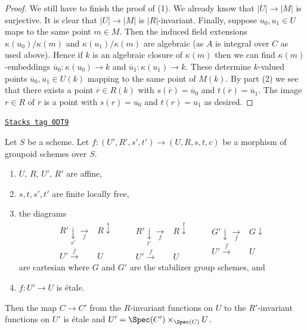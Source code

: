 \begin{proof}
\medskip\noindent
We still have to finish the proof of (1). We already know that
$|U| \to |M|$ is surjective. It is clear that $|U| \to |M|$ is
$|R|$-invariant. Finally, suppose $u_0, u_1 \in U$ maps to the same
point $m \in M$. Then the induced field extensions $\kappa(u_0)/\kappa(m)$
and $\kappa(u_1)/\kappa(m)$ are algebraic (as $A$ is integral over $C$
as used above). Hence if $k$ is an algebraic closure of $\kappa(m)$
then we can find $\kappa(m)$-embeddings $\overline{u}_0 : \kappa(u_0) \to k$
and $\overline{u}_1 : \kappa(u_1) \to k$. These determine $k$-valued
points $\overline{u}_0, \overline{u}_1 \in U(k)$ mapping to the same
point of $M(k)$. By part (2) we see that there exists a point
$\overline{r} \in R(k)$ with $s(\overline{r}) = \overline{u}_0$ and
$t(\overline{r}) = \overline{u}_1$. The image $r \in R$ of $\overline{r}$
is a point with $s(r) = u_0$ and $t(r) = u_1$ as desired.
\end{proof}

\begin{lemma}[Etale]
\label{groupoids-lemma-etale}
\href{https://stacks.math.columbia.edu/tag/0DT9}{\texttt{Stacks tag 0DT9}}

Let $S$ be a scheme. Let $f : (U', R', s', t') \to (U, R, s, t, c)$ be a
morphism of groupoid schemes over $S$.
\begin{enumerate}
\item $U$, $R$, $U'$, $R'$ are affine,
\item $s, t, s', t'$ are finite locally free,
\item the diagrams
$$
\begin{array}{cc}R' \underset{s'}{\downarrow}\underset{f}{\longrightarrow} & R \overset{s}{\downarrow} \\ U' \overset{f}{\longrightarrow} & U\end{array}
\quad
\quad
\begin{array}{cc}R' \underset{t'}{\downarrow}\underset{f}{\longrightarrow} & R \overset{t}{\downarrow} \\ U' \overset{f}{\longrightarrow} & U\end{array}
\quad
\quad
\begin{array}{cc}G' \downarrow\underset{f}{\longrightarrow} & G \downarrow \\ U' \overset{f}{\longrightarrow} & U\end{array}
$$
are cartesian where $G$ and $G'$ are the stabilizer group schemes, and
\item $f : U' \to U$ is \'etale.
\end{enumerate}
Then the map $C \to C'$ from the $R$-invariant functions on $U$
to the $R'$-invariant functions on $U'$ is \'etale and
$U' = \Spec(C') \times_{\Spec(C)} U$.
\end{lemma}

